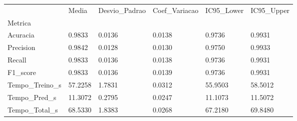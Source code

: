 \begin{tabular}{llllll}
\toprule
 & Media & Desvio_Padrao & Coef_Variacao & IC95_Lower & IC95_Upper \\
Metrica &  &  &  &  &  \\
\midrule
Acuracia & 0.9833 & 0.0136 & 0.0138 & 0.9736 & 0.9931 \\
Precision & 0.9842 & 0.0128 & 0.0130 & 0.9750 & 0.9933 \\
Recall & 0.9833 & 0.0136 & 0.0138 & 0.9736 & 0.9931 \\
F1_score & 0.9833 & 0.0136 & 0.0139 & 0.9736 & 0.9931 \\
Tempo_Treino_s & 57.2258 & 1.7831 & 0.0312 & 55.9503 & 58.5012 \\
Tempo_Pred_s & 11.3072 & 0.2795 & 0.0247 & 11.1073 & 11.5072 \\
Tempo_Total_s & 68.5330 & 1.8383 & 0.0268 & 67.2180 & 69.8480 \\
\bottomrule
\end{tabular}
